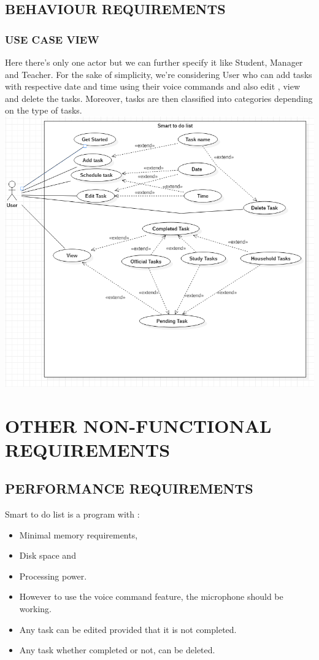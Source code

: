 \documentclass[12pt, a4paper]{report}
\begin{document}
\begin{enumerate}
\section{BEHAVIOUR REQUIREMENTS}
\subsection{USE CASE VIEW }

Here there’s only one actor but we can further specify it like Student, Manager and Teacher. For the sake of simplicity, we’re considering User who can add tasks with respective date and time using their voice commands and also edit , view and delete the tasks. Moreover, tasks are then classified into categories depending on the type of tasks. \newline \newline \includegraphics[scale=0.61]{usecase.png}


\chapter{OTHER NON-FUNCTIONAL REQUIREMENTS}
\section{PERFORMANCE REQUIREMENTS }
Smart to do list is a program with :
\begin{itemize}
	\item Minimal memory requirements, 
	\item Disk space and
	\item Processing power. 
	\item However to use the voice command feature, the microphone should be working.
	\item Any task can be edited provided that it is not completed.
	\item Any task whether completed or not, can be deleted.
\end{itemize}

\end{enumerate}
\end{document}

